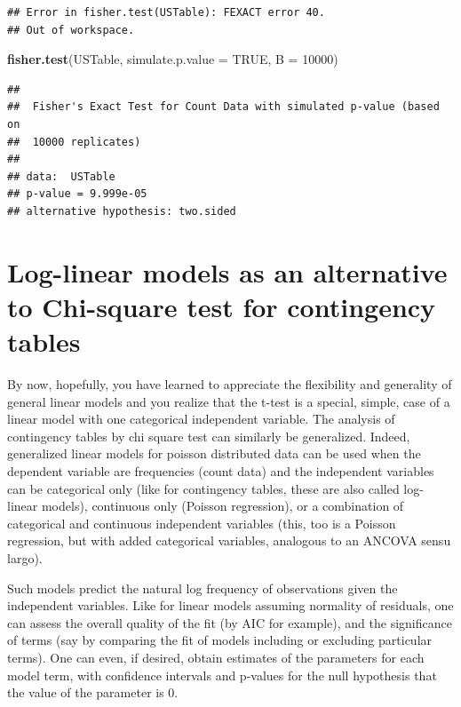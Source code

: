 \documentclass[
  12pt,
]{book}
\newenvironment{Shaded}{\begin{snugshade}}{\end{snugshade}}
\newcommand{\DataTypeTok}[1]{\textcolor[rgb]{0.13,0.29,0.53}{#1}}
\newcommand{\DecValTok}[1]{\textcolor[rgb]{0.00,0.00,0.81}{#1}}
\newcommand{\KeywordTok}[1]{\textcolor[rgb]{0.13,0.29,0.53}{\textbf{#1}}}
\newcommand{\NormalTok}[1]{#1}
\newcommand{\OtherTok}[1]{\textcolor[rgb]{0.56,0.35,0.01}{#1}}
\begin{document}
\begin{verbatim}
## Error in fisher.test(USTable): FEXACT error 40.
## Out of workspace.
\end{verbatim}

\begin{Shaded}
\begin{Highlighting}[]
\KeywordTok{fisher.test}\NormalTok{(USTable, }\DataTypeTok{simulate.p.value =} \OtherTok{TRUE}\NormalTok{, }\DataTypeTok{B =} \DecValTok{10000}\NormalTok{)}
\end{Highlighting}
\end{Shaded}

\begin{verbatim}
## 
##  Fisher's Exact Test for Count Data with simulated p-value (based on
##  10000 replicates)
## 
## data:  USTable
## p-value = 9.999e-05
## alternative hypothesis: two.sided
\end{verbatim}

\hypertarget{log-linear-models-as-an-alternative-to-chi-square-test-for-contingency-tables}{%
\section{Log-linear models as an alternative to Chi-square test for contingency tables}\label{log-linear-models-as-an-alternative-to-chi-square-test-for-contingency-tables}}

By now, hopefully, you have learned to appreciate the flexibility and generality of general linear models and you realize that the t-test is a special, simple, case of a linear model with one categorical independent variable. The analysis of contingency tables by chi square test can similarly be generalized. Indeed, generalized linear models for poisson distributed data can be used when the dependent variable are frequencies (count data) and the independent variables can be categorical only (like for contingency tables, these are also called log- linear models), continuous only (Poisson regression), or a combination of categorical and continuous independent variables (this, too is a Poisson regression, but with added categorical variables, analogous to an ANCOVA sensu largo).

Such models predict the natural log frequency of observations given the independent variables. Like for linear models assuming normality of residuals, one can assess the overall quality of the fit (by AIC for example), and the significance of terms (say by comparing the fit of models including or excluding particular terms). One can even, if desired, obtain estimates of the parameters for each model term, with confidence intervals and p-values for the null hypothesis that the value of the parameter is 0.
\end{document}
